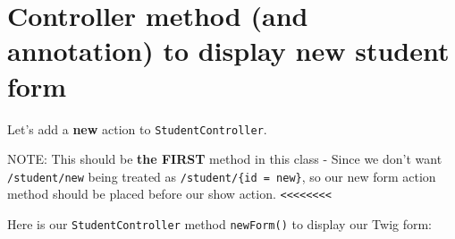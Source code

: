 \documentclass[a4paperpaper,openright]{book}
\newenvironment{Shaded}{}{}
\newcommand{\AnnotationTok}[1]{\textcolor[rgb]{0.38,0.63,0.69}{\textbf{\textit{#1}}}}
\newcommand{\CommentTok}[1]{\textcolor[rgb]{0.38,0.63,0.69}{\textit{#1}}}
\newcommand{\KeywordTok}[1]{\textcolor[rgb]{0.00,0.44,0.13}{\textbf{#1}}}
\newcommand{\NormalTok}[1]{#1}
\newcommand{\OtherTok}[1]{\textcolor[rgb]{0.00,0.44,0.13}{#1}}
\newcommand{\StringTok}[1]{\textcolor[rgb]{0.25,0.44,0.63}{#1}}
\begin{document}
\begin{Shaded}
\end{Shaded}

\hypertarget{controller-method-and-annotation-to-display-new-student-form}{%
\section{Controller method (and annotation) to display new student
form}\label{controller-method-and-annotation-to-display-new-student-form}}

Let's add a \textbf{new} action to \texttt{StudentController}.

NOTE: This should be \textbf{the FIRST} method in this class - Since we
don't want \texttt{/student/new} being treated as
\texttt{/student/\{id\ =\ \textquotesingle{}new\textquotesingle{}\}}, so
our new form action method should be placed before our show action.
\texttt{\textless{}\textless{}\textless{}\textless{}\textless{}\textless{}\textless{}\textless{}}

Here is our \texttt{StudentController} method \texttt{newForm()} to
display our Twig form:

\begin{Shaded}
\end{Shaded}
\end{document}
